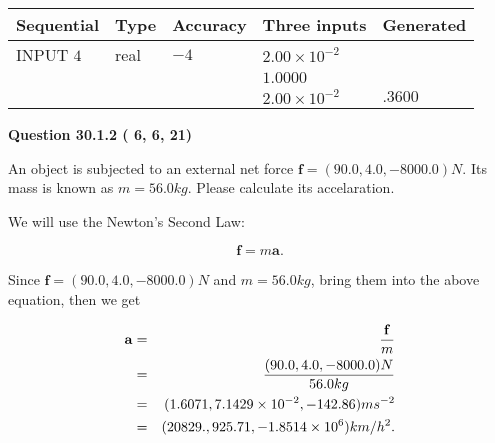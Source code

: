 \documentclass[12pt]{article}
\begin{document}
   
  
  
\noindent\begin{tabular}{|l|l|l|l|l|}
\hline
 Sequential & Type & Accuracy & Three inputs & Generated \\ 
\hline
 
 
  INPUT $           4$ & real & $          -4 $ & $
 2.00 \times 10^{-2}
  $ & \\
  & & &  $
 1.0000
  $ & \\
  & & &  $
 2.00 \times 10^{-2}
 $ & $ .3600 $ 
 \\  \hline  
 \end{tabular}
   
   
  
\vspace{0.2in}
  
{\textbf{\Large{Question
30.1.2 
 (          6,          6,         21)
}}}
  
  
 
An object is subjected to an external net force $\mathbf{f}=(
90.0,  %
4.0,
-8000.0  )N$. Its mass is known as
$m= %
56.0 kg$. Please calculate its accelaration.
 
 
 
 
\noindent{}
 
 

We will use the Newton's Second Law:
 
\[
\mathbf{f}=m\mathbf{a}.
\]
 
Since $\mathbf{f}=( %
90.0,  %
4.0,  %
-8000.0 )N$
and $m= %
56.0 kg$, bring them into the above equation, then we get
 
\begin{eqnarray*}
\mathbf{a}&=&\frac{\mathbf{f}}m  \\
&=&\frac{(
90.0 ,
4.0 ,
-8000.0 )N
}{ %
56.0 kg}  \\
&=&(
1.6071 ,
7.1429 \times 10^{-2},
-142.86
)ms^{-2} \\
&=&(
20829. ,
925.71 ,
-1.8514 \times 10^{6}
)km/h^2.
\end{eqnarray*}
 
 
 
\noindent{}
 
 

 
 
 
\noindent{}
 
\end{document}
